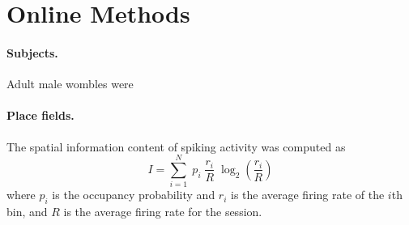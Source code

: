 
\section*{Online Methods}

\paragraph{Subjects.} 
Adult male wombles were \lipsum[8-9]

\paragraph{Place fields.}
The spatial information content\cite{SkagMcNa93a} of spiking activity was computed as
\begin{equation}
  I=\sum_{i=1}^{N} \; p_i \; \frac{r_i}{R} \; \log_2\left(\frac{r_i}{R}\right)
  \label{eq:skaggs}
\end{equation}
where $p_i$ is the occupancy probability and $r_i$ is the average firing rate of the $i$th bin, and $R$ is the average firing rate for the session. 

